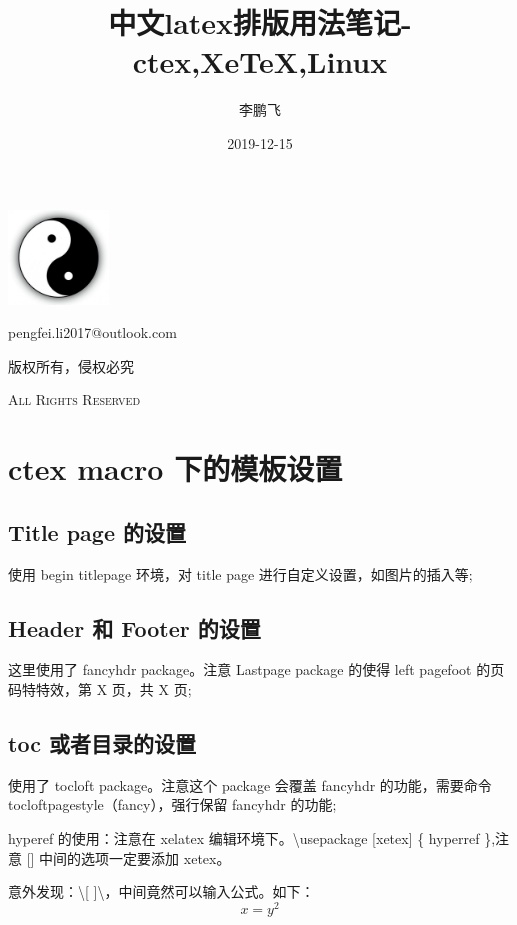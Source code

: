 \documentclass[UTF8,fancyhdr,a4paper]{ctexart}
\title{中文latex排版用法笔记-ctex,XeTeX,Linux}
\author{李鹏飞}
\date{2019-12-15}
\begin{document}
\begin{titlepage}
\maketitle
{}
\centering
\vspace{10cm}
\includegraphics[width = 0.2\textwidth]{YinYang.jpg}\par
\vspace{1cm}
{\huge pengfei.li2017@outlook.com}\par
\vspace{0.5cm}
{\small 版权所有，侵权必究}\par
\vspace{0.5cm}
{\scshape \small All Rights Reserved}
\end{titlepage}

\tableofcontents
{}%
\clearpage
\listoffigures
{}
\clearpage
\listoftables
{}
\clearpage

\newpage
{}
\section{ctex macro 下的模板设置}

\subsection{Title page 的设置}
使用 begin titlepage 环境，对 title page 进行自定义设置，如图片的插入等;
\subsection{Header 和 Footer 的设置}
这里使用了 fancyhdr package。注意 Lastpage package 的使得 left pagefoot 的页码特特效，第 X 页，共 X 页;
\subsection{toc 或者目录的设置}
使用了 tocloft package。注意这个 package 会覆盖 fancyhdr 的功能，需要命令 tocloftpagestyle（fancy），强行保留 fancyhdr 的功能;\par
hyperef 的使用：注意在 xelatex 编辑环境下。\textbackslash usepackage [xetex] \{ hyperref \},注意 [\space] 中间的选项一定要添加 xetex。\par 
意外发现：\textbackslash[ \space ]\textbackslash ，中间竟然可以输入公式。如下：
\[ x = y^2 \]
\end{document}
